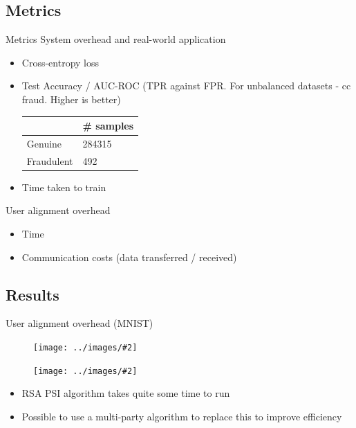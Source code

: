 \documentclass[xcolor=dvipsnames]{beamer}
\newcommand{\rimg}[2] {
  \begin{figure}
    \centering
    \texttt{[image: ../images/\#2]}
  \end{figure}
}
\begin{document}
\subsection{Metrics}
\begin{frame}{Metrics}
System overhead and real-world application
  \begin{itemize}
      \item Cross-entropy loss
      \item Test Accuracy / AUC-ROC (TPR against FPR. For unbalanced datasets - cc fraud. Higher is better)
      
      \begin{table}[]
        \centering
        \label{tab:my-table}
        \begin{tabular}{|l|l|}
        \hline
         & \# samples \\ \hline
        Genuine & 284315 \\ \hline
        Fraudulent & 492 \\ \hline
        \end{tabular}
        \end{table}
      \item Time taken to train
  \end{itemize}

User alignment overhead
  \begin{itemize}
      \item Time
      \item Communication costs (data transferred / received)
  \end{itemize}
\end{frame}

\subsection{Results}
\begin{frame}{User alignment overhead (MNIST)}
    \begin{minipage}{.5\textwidth}
      \centering
      \rimg{0.45}{ua_bytes.pdf}
    \end{minipage}%
    \begin{minipage}{.5\textwidth}
      \centering
      \rimg{0.45}{ua_time.pdf}
    \end{minipage}
    \begin{itemize}
      \item RSA PSI algorithm takes quite some time to run
      \item Possible to use a multi-party algorithm to replace this to improve efficiency
    \end{itemize}
\end{frame}
\end{document}
